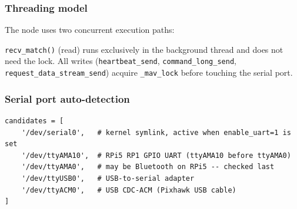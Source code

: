 \documentclass[11pt,a4paper]{article}
\begin{document}
\subsubsection{Threading model}

The node uses two concurrent execution paths:

\begin{center}
\end{center}

\texttt{recv\_match()} (read) runs exclusively in the background thread and
does not need the lock. All writes (\texttt{heartbeat\_send},
\texttt{command\_long\_send}, \texttt{request\_data\_stream\_send}) acquire
\texttt{\_mav\_lock} before touching the serial port.

\subsubsection{Serial port auto-detection}

\begin{lstlisting}[style=python, caption=Serial port candidate order (F-02 fix applied)]
candidates = [
    '/dev/serial0',   # kernel symlink, active when enable_uart=1 is set
    '/dev/ttyAMA10',  # RPi5 RP1 GPIO UART (ttyAMA10 before ttyAMA0)
    '/dev/ttyAMA0',   # may be Bluetooth on RPi5 -- checked last
    '/dev/ttyUSB0',   # USB-to-serial adapter
    '/dev/ttyACM0',   # USB CDC-ACM (Pixhawk USB cable)
]
\end{lstlisting}
\end{document}
